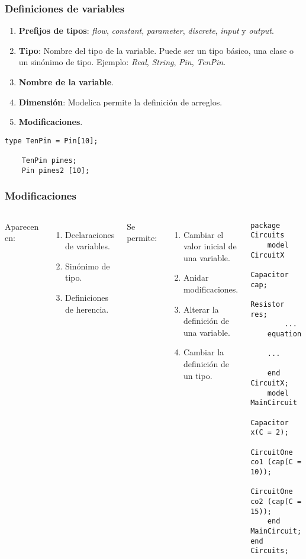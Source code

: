 \documentclass[aspectratio=169,10pt]{beamer}
\begin{document}
\begin{frame}[fragile]
\frametitle{Definiciones de variables} 
\begin{enumerate}
\item \textbf{Prefijos de tipos}: \textit{flow}, \textit{constant}, \textit{parameter}, \textit{discrete}, \textit{input} y \textit{output}.
\item \textbf{Tipo}: Nombre del tipo de la variable. Puede ser un tipo b\'asico, una clase o un sin\'onimo de tipo.  Ejemplo: \textit{Real}, \textit{String}, \textit{Pin}, \textit{TenPin}.
\item \textbf{Nombre de la variable}. 
\item \textbf{Dimensi\'on}: Modelica permite la definici\'on de arreglos.
\item \textbf{Modificaciones}.
\end{enumerate}
\begin{lstlisting}[style=base]
    type TenPin = Pin[10];  
    
    TenPin pines;
    Pin pines2 [10];
\end{lstlisting}
\par

\end{frame}

\begin{frame}[fragile]
\frametitle{Modificaciones} 

\begin{columns}  
\column[T]{7cm}
Aparecen en: 
\begin{enumerate}
    \item Declaraciones de variables.
    \item Sin\'onimo de tipo.
    \item Definiciones de herencia.
\end{enumerate} 

Se permite:
\begin{enumerate}
    \item Cambiar el valor inicial de una variable.
    \item Anidar modificaciones.
    \item Alterar la definici\'on de una variable.
    \item Cambiar la definici\'on de un tipo.
\end{enumerate}
\column[T]{7cm}
\begin{lstlisting}[style=base]
package Circuits
    model CircuitX
        Capacitor cap;
        Resistor res;
        ...
    equation 
    
    ...
        
    end CircuitX;
    model MainCircuit
        Capacitor x(C = 2);
        CircuitOne co1 (cap(C = 10));
        CircuitOne co2 (cap(C = 15));
    end MainCircuit;
end Circuits;
\end{lstlisting}

 
\end{columns}
\end{frame}
\end{document}
